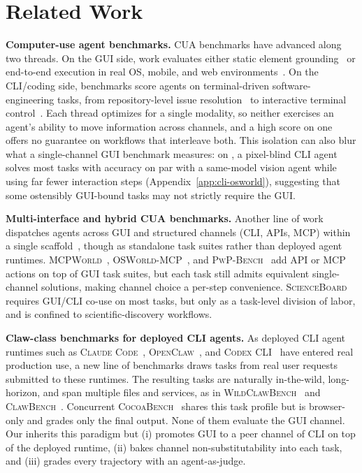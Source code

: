 \section{Related Work}
\label{sec:related}

\noindent\textbf{Computer-use agent benchmarks.}
CUA benchmarks have advanced along two threads. On the GUI side, work evaluates either static element grounding~\citep{li2025screenspotpro,cheng2024seeclick,wu2024osatlas,you2024ferretui,lin2024showui,xu2024aguvis} or end-to-end execution in real OS, mobile, and web environments~\citep{xie2024osworld,bonatti2024waa,rawles2025androidworld,zhou2024webarena,koh2024visualwebarena}. On the CLI/coding side, benchmarks score agents on terminal-driven software-engineering tasks, from repository-level issue resolution~\citep{jimenez2024swebench,openai2024swebenchverified} to interactive terminal control~\citep{terminalbench2025,chu2026terminalworld}. Each thread optimizes for a single modality, so neither exercises an agent's ability to move information across channels, and a high score on one offers no guarantee on workflows that interleave both. This isolation can also blur what a single-channel GUI benchmark measures: on \osworld{}, a pixel-blind CLI agent solves most tasks with accuracy on par with a same-model vision agent while using far fewer interaction steps (Appendix~\ref{app:cli-osworld}), suggesting that some ostensibly GUI-bound tasks may not strictly require the GUI.

\medskip
\noindent\textbf{Multi-interface and hybrid CUA benchmarks.}
Another line of work dispatches agents across GUI and structured channels (CLI, APIs, MCP) within a single scaffold~\citep{song2025coact1,microsoft2025ufo2}, though as standalone task suites rather than deployed agent runtimes. \textsc{MCPWorld}~\citep{yan2025mcpworld}, \textsc{OSWorld-MCP}~\citep{jia2025osworldmcp}, and \textsc{PwP-Bench}~\citep{aggarwal2025pwp} add API or MCP actions on top of GUI task suites, but each task still admits equivalent single-channel solutions, making channel choice a per-step convenience. \textsc{ScienceBoard}~\citep{sun2026scienceboard} requires GUI/CLI co-use on most tasks, but only as a task-level division of labor, and is confined to scientific-discovery workflows.

\medskip
\noindent\textbf{Claw-class benchmarks for deployed CLI agents.}
As deployed CLI agent runtimes such as \textsc{Claude Code}~\citep{anthropic2025claudecode}, \textsc{OpenClaw}~\citep{openclaw2025}, and \textsc{Codex CLI}~\citep{openai2026codexagent} have entered real production use, a new line of benchmarks draws tasks from real user requests submitted to these runtimes. The resulting tasks are naturally in-the-wild, long-horizon, and span multiple files and services, as in \textsc{WildClawBench}~\citep{ding2026wildclawbench} and \textsc{ClawBench}~\citep{zhang2026clawbench}. Concurrent \textsc{CocoaBench}~\citep{hao2026cocoabench} shares this task profile but is browser-only and grades only the final output. None of them evaluate the GUI channel. Our \Eyeson{} inherits this paradigm but (i) promotes GUI to a peer channel of CLI on top of the deployed runtime, (ii) bakes channel non-substitutability into each task, and (iii) grades every trajectory with an agent-as-judge.
